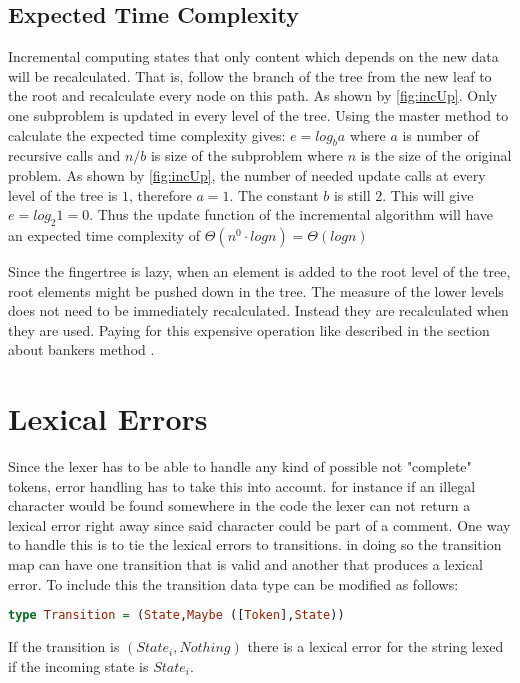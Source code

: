 \subsection{Expected Time Complexity}
Incremental computing states that only content which depends on the new
data will be recalculated. That is, follow the branch of the tree from the new
leaf to the root and recalculate every node on this path. As shown by
\cref{fig:incUp}. Only one subproblem is updated in every level of the tree.
Using the master method to calculate the expected time complexity gives:
$e = log_b a$ where $a$ is number of recursive calls and $n/b$ is size of the
subproblem where $n$ is the size of the original problem. As shown by
\cref{fig:incUp}, the number of needed update calls at every level of the tree
is $1$, therefore $a = 1$. The constant $b$ is still $2$. This will give
$e = log_2 1 = 0$. Thus the update function of the incremental algorithm will
have an expected time complexity of $\Theta(n^0 \cdot log n) = \Theta(log n)$

Since the fingertree is lazy, when an element is added to the root level of the
tree, root elements might be pushed down in the tree. The measure of the
lower levels does not need to be immediately recalculated. Instead they
are recalculated when they are used. Paying for this expensive operation like
described in the section about bankers method \cite{fingertree}.

\section{Lexical Errors}
Since the lexer has to be able to handle any kind of possible not "complete"
tokens, error handling has to take this into account. for instance if an illegal
character would be found somewhere in the code the lexer can not return a lexical
error right away since said character could be part of a comment. One way to
handle this is to tie the lexical errors to transitions. in doing so the
transition map can have one transition that is valid and another that produces a
lexical error. To include this the transition data type can be modified as
follows:
\begin{lstlisting}[language=Haskell]
type Transition = (State,Maybe ([Token],State))
\end{lstlisting}
If the transition is $(State_i,Nothing)$ there is a lexical error for the string
lexed if the incoming state is $State_i$.


